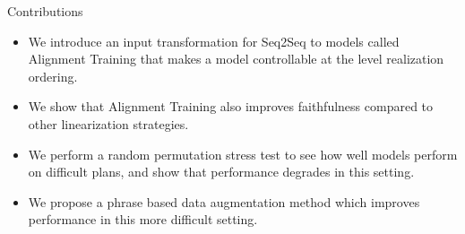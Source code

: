 \begin{frame}{Contributions}


\begin{itemize}



    \item We introduce an input transformation for Seq2Seq to models
    called Alignment Training that makes a model controllable at the level
    realization ordering.

\vspace{10pt}

    \item We  show that Alignment Training also improves faithfulness
    compared to other linearization strategies. 

\vspace{10pt}
\item We perform a random permutation stress test to see how well models perform on difficult plans, and show that performance degrades in this setting.

\vspace{10pt}
\item We propose a phrase based data augmentation method which improves 
performance in this more difficult setting.

\end{itemize}

\end{frame}


